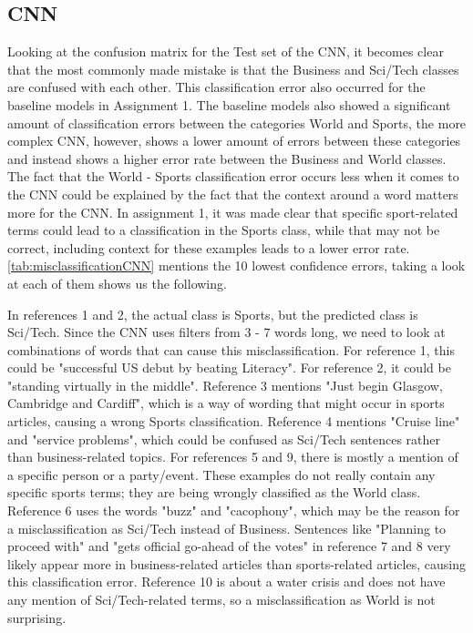 \documentclass[12pt,a4paper,english]{article}
\begin{document}
\subsection{CNN}
Looking at the confusion matrix for the Test set of the CNN, it becomes clear that the most commonly made mistake is that the Business and Sci/Tech classes are confused with each other. This classification error also occurred for the baseline models in Assignment 1. The baseline models also showed a significant amount of classification errors between the categories World and Sports, the more complex CNN, however, shows a lower amount of errors between these categories and instead shows a higher error rate between the Business and World classes. The fact that the World - Sports classification error occurs less when it comes to the CNN could be explained by the fact that the context around a word matters more for the CNN. In assignment 1, it was made clear that specific sport-related terms could lead to a classification in the Sports class, while that may not be correct, including context for these examples leads to a lower error rate. \ref{tab:misclassificationCNN} mentions the 10 lowest confidence errors, taking a look at each of them shows us the following. 

In references 1 and 2, the actual class is Sports, but the predicted class is Sci/Tech. Since the CNN uses filters from 3 - 7 words long, we need to look at combinations of words that can cause this misclassification. For reference 1, this could be "successful US debut by beating Literacy". For reference 2, it could be "standing virtually in the middle". Reference 3 mentions "Just begin Glasgow, Cambridge and Cardiff", which is a way of wording that might occur in sports articles, causing a wrong Sports classification. Reference 4 mentions "Cruise line" and "service problems", which could be confused as Sci/Tech sentences rather than business-related topics. For references 5 and 9, there is mostly a mention of a specific person or a party/event. These examples do not really contain any specific sports terms; they are being wrongly classified as the World class. Reference 6 uses the words "buzz" and "cacophony", which may be the reason for a misclassification as Sci/Tech instead of Business. Sentences like "Planning to proceed with" and "gets official go-ahead of the votes" in reference 7 and 8 very likely appear more in business-related articles than sports-related articles, causing this classification error. Reference 10 is about a water crisis and does not have any mention of Sci/Tech-related terms, so a misclassification as World is not surprising. 
\end{document}
